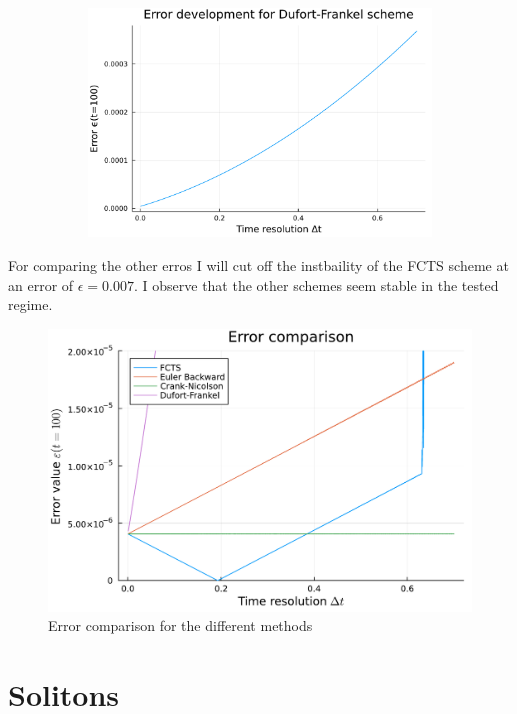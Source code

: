 \documentclass[
	a4paper, %
	10pt, %
]{CSUniSchoolLabReport}
\begin{document}
\begin{figure}[H]
\begin{subfigure}[b]{0.49\textwidth}
	\end{subfigure}
	\hfill
	\begin{subfigure}[b]{0.49\textwidth}
		\includegraphics[width=\textwidth]{../saves_t2/error_development_df.pdf}
	\end{subfigure}
	\hfill
\end{figure}

For comparing the other erros I will cut off the instbaility of the FCTS scheme at an error of $\epsilon = 0.007$. I observe that the other schemes seem stable in the tested regime.

\begin{figure}[H]
	\centering
	\includegraphics[width=\textwidth]{../saves_t2/error_comp_diffusion.pdf}
	\caption{Error comparison for the different methods}
\end{figure}


\section{Solitons}
\end{document}
